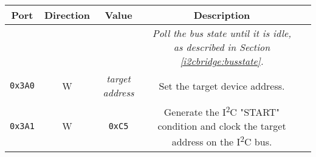 \documentclass[twoside,10pt,letterpaper]{refart}
\newcommand{\itwoc}{I\textsuperscript{2}C}
\begin{document}
\begin{center}
    \begin{tabular}{ c|c|c|c|c }
        \textbf{Port} & \textbf{Direction} & \textbf{Value} & \textbf{Description} \\
        \hline
        & & & \textit{Poll the bus state until it is idle, as described in Section \ref{i2cbridge:busstate}.} \\
        \texttt{0x3A0} & W & \textit{target address} & Set the target device address. \\
        \texttt{0x3A1} & W & \texttt{0xC5} & Generate the \itwoc{} "START" condition and clock the target address on the \itwoc{} bus. \\
    \end{tabular}
\end{center}

\newpage
\end{document}
